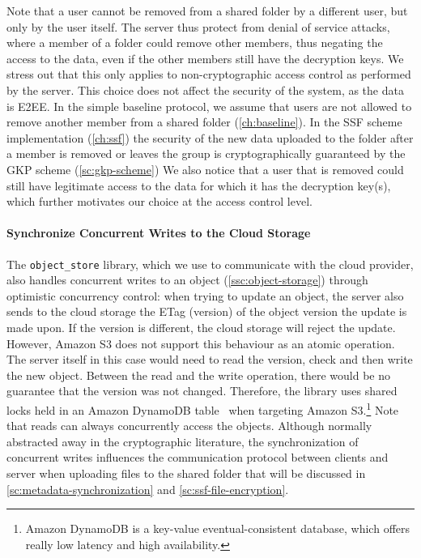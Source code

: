 Note that a user cannot be removed from a shared folder
by a different user, but only by the user itself.
The server thus protect from denial of service attacks,
where a member of a folder could remove other members,
thus negating the access to the data, even if the other
members still have the decryption keys.
We stress out that this only applies to non-cryptographic
access control as performed
by the server.
This choice does not affect the security of the system,
as the data is E2EE.
In the simple baseline protocol,
we assume that users are not allowed to
remove another member from a shared folder (\cref{ch:baseline}).
In the SSF scheme implementation (\cref{ch:ssf})
the security of the new data uploaded to the folder
after a member is removed or leaves the group
is cryptographically guaranteed by the GKP scheme (\cref{sc:gkp-scheme})
We also notice that a user that is removed could still
have legitimate access to the data for which
it has the decryption key(s), which further motivates
our choice at the access control level.


\paragraph{Synchronize Concurrent Writes to the Cloud Storage}\label{sc:ssf-file-changes-sync}
The \texttt{object\_store} library, which
we use to communicate with the cloud provider,
also handles concurrent writes
to an object (\cref{ssc:object-storage})
through optimistic concurrency control:
when trying to update an object,
the server also sends to the cloud storage the
ETag (version)
of the object version the update is made upon.
If the version is different, 
the cloud storage will reject the update.
However, Amazon S3 does not support this 
behaviour as an atomic operation. 
The server itself in this case would need to read the version,
check and then write the new object.
Between the read and the write operation,
there would be no guarantee that the version was not changed.
Therefore, the library uses shared locks held in an Amazon DynamoDB 
table~\cite{objectStoreCommitProtocol} when targeting Amazon S3.\footnote{Amazon DynamoDB is a key-value eventual-consistent database, which offers really low latency and high availability.}
Note that reads can always concurrently access the objects. 
Although normally abstracted away in the cryptographic
literature, the synchronization of concurrent writes
influences the communication protocol
between clients and server when uploading
files to the shared folder 
that will be discussed in
\cref{sc:metadata-synchronization}
and \cref{sc:ssf-file-encryption}.

